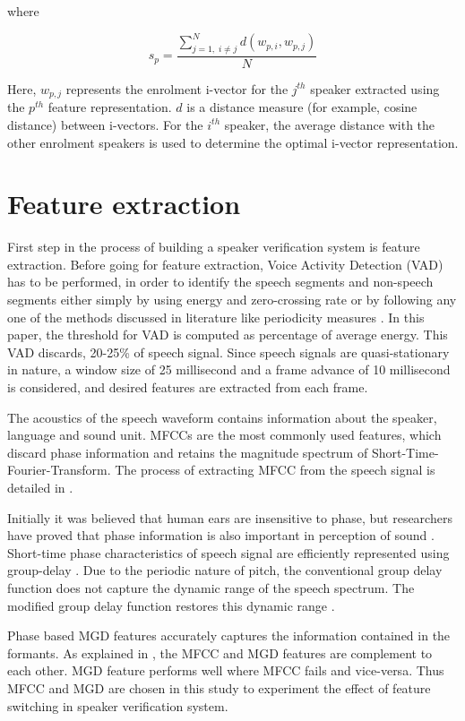 \documentclass{article}
\begin{document}
where 

\begin{equation}
s_p = \frac{\displaystyle \sum_{j=1, \; i \neq j}^N d(w_{p,i},w_{p,j})}{N}
\end{equation}

Here, $w_{p,j}$ represents the enrolment i-vector for the $j^{th}$ speaker
extracted using the $p^{th}$ feature representation. $d$ is a distance measure (for
example, cosine distance) between i-vectors. For the $i^{th}$ speaker, the average
distance with the other enrolment speakers is used to determine the optimal
i-vector representation.

\section{Feature extraction}
\label{sec:featExt}
First step in the process of building a speaker verification system is feature extraction.
Before going for feature extraction, Voice Activity Detection (VAD) has to be performed, in order to identify the speech segments and non-speech segments either simply by using energy
 \cite{vadenergy, vadhari} and zero-crossing \cite{vadzc} rate or by following any one of the methods discussed in literature like periodicity measures \cite{vadtucker}.
In this paper, the threshold for VAD is computed as percentage of average energy. This VAD discards, 20-25\% of speech signal. Since speech signals are quasi-stationary in nature, a window size of 25 millisecond and a frame advance of 10 millisecond is considered, and desired features are extracted from each frame. 

The acoustics of the speech waveform contains information about the speaker, language and sound unit. MFCCs are the most commonly used features, which discard phase information and retains the magnitude spectrum of Short-Time-Fourier-Transform. The process of extracting MFCC from the speech signal is detailed in \cite{mel}.

Initially it was believed that human ears are insensitive to phase, but researchers have  proved that phase information is also important in perception of sound \cite{shi}.  Short-time phase characteristics of speech signal are efficiently represented using group-delay \cite{group_delay}. Due to the periodic nature of pitch, the conventional group delay function does not capture the dynamic range of the speech spectrum. The modified group delay function restores this dynamic range \cite{hema_gds}.

Phase based MGD features accurately captures the information contained in the formants.  As explained in  \cite{mgd_complement}, the MFCC and MGD features are complement to each other. MGD feature performs well where MFCC fails and vice-versa. Thus MFCC and MGD are chosen in this study to experiment the effect of feature switching in speaker verification system.
\end{document}

